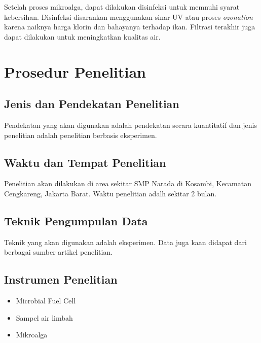\documentclass[10pt,a4paper,hidelinks]{article}
\begin{document}
    
    Setelah proses mikroalga, dapat dilakukan disinfeksi untuk memnuhi syarat kebersihan. Disinfeksi disarankan menggunakan sinar UV atau proses \textit{ozonation} karena naiknya harga klorin dan bahayanya terhadap ikan. Filtrasi terakhir juga dapat dilakukan untuk meningkatkan kualitas air.
    \section{Prosedur Penelitian}
    \subsection{Jenis dan Pendekatan Penelitian}
    Pendekatan yang akan digunakan adalah pendekatan secara kuantitatif dan jenis penelitian adalah penelitian berbasis eksperimen.
    \subsection{Waktu dan Tempat Penelitian}
    Penelitian akan dilakukan di area sekitar SMP Narada di Kosambi, Kecamatan Cengkareng, Jakarta Barat. Waktu penelitian adalh sekitar 2 bulan.
    \subsection{Teknik Pengumpulan Data}
    Teknik yang akan digunakan adalah eksperimen. Data juga kaan didapat dari berbagai sumber artikel penelitian.
    
    \subsection{Instrumen Penelitian}
    \begin{itemize}
    \item Microbial Fuel Cell
    \item Sampel air limbah
    \item Mikroalga
    \end{itemize}
    
    \nocite{*}
    
    
\end{document}
